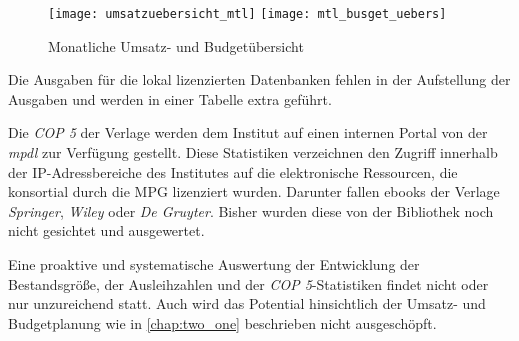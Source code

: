 \begin{figure}[h]
    \centering
        \texttt{[image: umsatzuebersicht\_mtl]}
        \texttt{[image: mtl\_busget\_uebers]}
        \caption{Monatliche Umsatz- und Budgetübersicht}
        \label{fig:budget- und umsatzuebersicht}
\end{figure}

Die Ausgaben für die lokal lizenzierten Datenbanken fehlen in der Aufstellung der Ausgaben und werden in einer Tabelle extra geführt.

Die \textit{\acrfull{COP 5}} der Verlage werden dem Institut auf einen internen Portal von der \textit{\acrshort{mpdl}} zur Verfügung gestellt.
Diese Statistiken verzeichnen den Zugriff innerhalb der IP-Adressbereiche des Institutes auf die elektronische Ressourcen, 
die konsortial durch die \acrshort{MPG} lizenziert wurden. Darunter fallen ebooks der Verlage 
\textit{Springer}, \textit{Wiley} oder \textit{De Gruyter}. Bisher wurden diese von der Bibliothek noch nicht gesichtet und ausgewertet.

Eine proaktive und systematische Auswertung der Entwicklung der Bestandsgröße, der Ausleihzahlen und der \textit{\acrshort{COP 5}}-Statistiken findet nicht
oder nur unzureichend statt. Auch wird das Potential hinsichtlich der Umsatz- und Budgetplanung wie in \autoref{chap:two_one} beschrieben
nicht ausgeschöpft.


